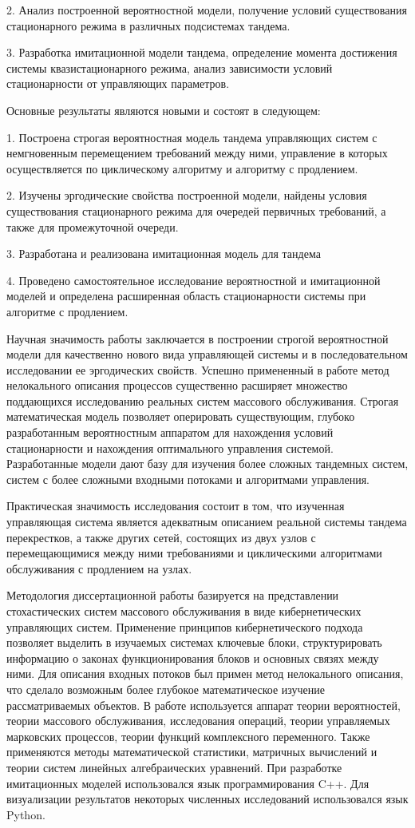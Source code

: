 \documentclass[14pt]{extarticle}
\theoremstyle{theorem}
\theoremstyle{remark}
\begin{document}
2. Анализ построенной вероятностной модели, получение условий существования стационарного режима в различных подсистемах тандема.

3. Разработка имитационной модели тандема, определение момента достижения системы квазистационарного режима, анализ зависимости условий стационарности от управляющих параметров.


{\novelty} Основные результаты являются новыми и состоят в следующем:

1. Построена строгая вероятностная модель тандема управляющих систем с немгновенным перемещением требований между ними, управление в которых осуществляется по циклическому алгоритму и алгоритму с продлением. 

2. Изучены эргодические свойства построенной модели, найдены условия существования стационарного режима для очередей первичных требований, а также для промежуточной очереди.

3. Разработана и реализована имитационная модель для тандема

4. Проведено самостоятельное исследование вероятностной и имитационной моделей и определена расширенная область стационарности системы при алгоритме с продлением.


{\influence} Научная значимость работы заключается в построении строгой вероятностной модели 
для качественно нового вида управляющей системы и в последовательном исследовании ее эргодических свойств. Успешно примененный в работе метод нелокального описания процессов существенно расширяет множество поддающихся исследованию реальных систем массового обслуживания. Строгая математическая модель позволяет оперировать существующим, глубоко разработанным вероятностным аппаратом для нахождения условий стационарности и нахождения оптимального управления системой. 
 Разработанные модели дают базу для изучения более сложных тандемных систем, систем с более сложными входными потоками и алгоритмами управления.

Практическая значимость исследования состоит в том, что изученная управляющая система является адекватным описанием реальной системы тандема перекрестков, а также других сетей, состоящих из двух узлов с перемещающимися между ними требованиями и циклическими алгоритмами обслуживания с продлением на узлах.


{\methods} Методология диссертационной работы базируется на представлении стохастических систем массового обслуживания в виде кибернетических управляющих систем. Применение принципов кибернетического подхода позволяет выделить в изучаемых системах ключевые блоки, структурировать информацию о законах функционирования блоков и основных связях между ними. Для описания входных потоков был примен метод нелокального описания, что сделало возможным более глубокое математическое изучение рассматриваемых объектов. В работе используется аппарат теории вероятностей, теории массового обслуживания, исследования операций, теории управляемых марковских процессов, теории функций комплексного переменного. Также применяются методы математической статистики, матричных вычислений и теории систем линейных алгебраических уравнений. При разработке имитационных моделей использовался язык программирования C++. Для визуализации результатов некоторых численных исследований использовался язык Python.
\end{document}
